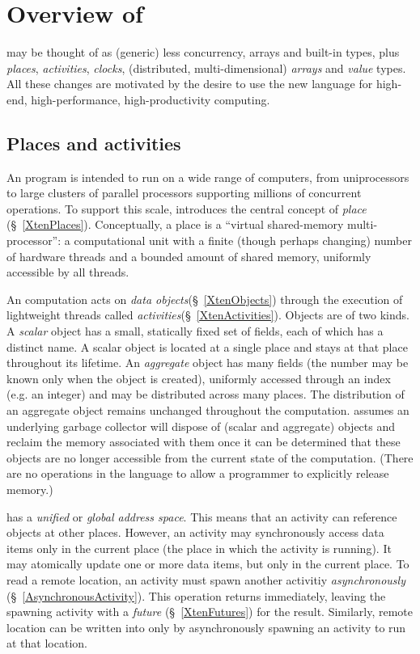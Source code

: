 \chapter{Overview of \Xten}

\Xten{} may be thought of as (generic) \java{} less concurrency,
arrays and built-in types, plus \emph{places},
\emph{activities}, \emph{
clocks}, (distributed, multi-dimensional) \emph{arrays} and
\emph{value}
types. All these changes are motivated by the desire to use the new
language for high-end, high-performance, high-productivity computing.

\section{Places and activities}
An \Xten{} program is intended to run on a wide range of computers,
from uniprocessors to large clusters of parallel processors supporting
millions of concurrent operations. To support this scale, \Xten{}
introduces the central concept of \emph{place} (\S~\ref{XtenPlaces}).
Conceptually, a place is a ``virtual shared-memory multi-processor'':
a computational unit with a finite (though perhaps changing) number of
hardware threads and a bounded amount of shared memory, uniformly
accessible by all threads.

An \Xten{} computation acts on \emph{data
objects}(\S~\ref{XtenObjects}) through the execution of lightweight
threads called \emph{activities}(\S~\ref{XtenActivities}).  Objects are
of two kinds. A \emph{scalar} object has a small, statically fixed set
of fields, each of which has a distinct name. A scalar object is
located at a single place and stays at that place throughout its
lifetime.  An \emph{aggregate} object has many fields (the number may
be known only when the object is created), uniformly accessed through
an index (e.g.{} an integer) and may be distributed across many
places. The distribution of an aggregate object remains unchanged
throughout the computation. \Xten{} assumes an underlying garbage
collector will dispose of (scalar and aggregate) objects and reclaim
the memory associated with them once it can be determined that these
objects are no longer accessible from the current state of the
computation. (There are no operations in the language to allow a
programmer to explicitly release memory.)

{}\Xten{} has a \emph{unified} or \emph{global address space}. This
means that an activity can reference objects at other places.
However, an activity may synchronously access data items only in the
current place (the place in which the activity is running). It may
atomically update one or more data items, but only in the current
place.  To read a remote location, an activity must spawn another
activitiy \emph{asynchronously} (\S~\ref{AsynchronousActivity}). This
operation returns immediately, leaving the spawning activity with a
\emph{future} (\S~\ref{XtenFutures}) for the result. Similarly, remote
location can be written into only by asynchronously spawning an
activity to run at that location.

